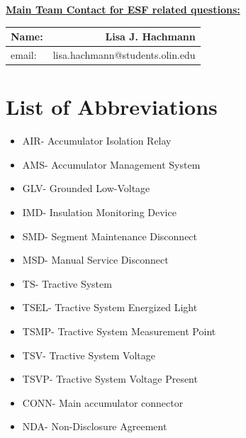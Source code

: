 \documentclass{article}
\begin{document}
\begin{titlepage}
\textbf{\underline{Main Team Contact for ESF related questions:}}

    \begin{table}[H]
        \centering
        \label{overallresponsible}
        \begin{tabular}{lr}
        Name: & Lisa J. Hachmann \\ \hline
        email: & lisa.hachmann@students.olin.edu  \\ \hline
        \end{tabular}
    \end{table}
    \vfill

\end{titlepage}

\tableofcontents
\listoffigures


\setlength{\parindent}{0pt}

\newpage

\listoftables
{}

\newpage

\section*{List of Abbreviations}
        \begin{itemize}
        \item AIR- Accumulator Isolation Relay
        \item AMS- Accumulator Management System
        \item GLV- Grounded Low-Voltage
        \item IMD- Insulation Monitoring Device
        \item SMD- Segment Maintenance Disconnect
        \item MSD- Manual Service Disconnect
        \item TS- Tractive System
        \item TSEL- Tractive System Energized Light
        \item TSMP- Tractive System Measurement Point
        \item TSV- Tractive System Voltage
        \item TSVP- Tractive System Voltage Present
        \item CONN- Main accumulator connector
        \item NDA- Non-Disclosure Agreement
        \end{itemize}
\end{document}
